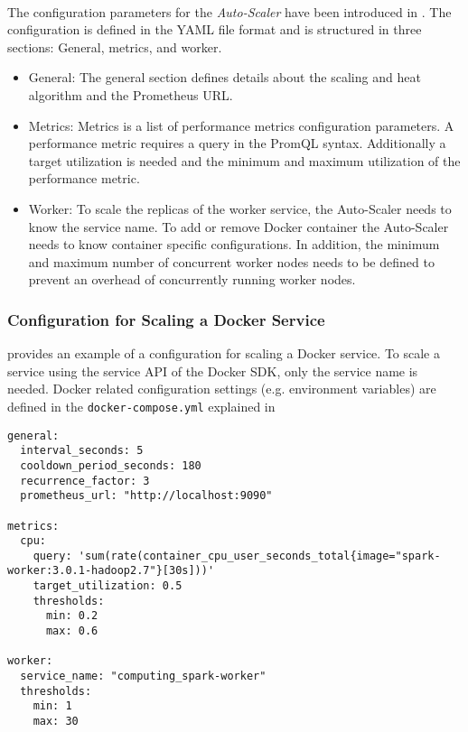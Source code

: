 \paragraph{}
The configuration parameters for the \textit{Auto-Scaler} have been introduced in .
The configuration is defined in the YAML file format and is structured in three sections: General, metrics, and worker.
\begin{itemize}
\item General:
The general section defines details about the scaling and heat algorithm and the Prometheus URL.

\item Metrics:
Metrics is a list of performance metrics configuration parameters. A performance metric requires a query in the PromQL syntax. Additionally a target utilization is needed and the minimum and maximum utilization of the performance metric.

\item Worker:
To scale the replicas of the worker service, the Auto-Scaler needs to know the service name. To add or remove Docker container the Auto-Scaler needs to know container specific configurations. In addition, the minimum and maximum number of concurrent worker nodes needs to be defined to prevent an overhead of concurrently running worker nodes.
\end{itemize}


\subsubsection{Configuration for Scaling a Docker Service}
 provides an example of a configuration for scaling a Docker service.
%
To scale a service using the service API of the Docker SDK, only the service name is needed.
%
Docker related configuration settings (e.g. environment variables) are defined in the \texttt{docker-compose.yml} explained in 
\begin{lstlisting}[label=lst:06_auto-scaler_config_service_example, caption=\textit{Auto-Scaler} configuration for scaling Docker Services]
general:
  interval_seconds: 5
  cooldown_period_seconds: 180
  recurrence_factor: 3
  prometheus_url: "http://localhost:9090"
 
metrics:
  cpu:
    query: 'sum(rate(container_cpu_user_seconds_total{image="spark-worker:3.0.1-hadoop2.7"}[30s]))'
    target_utilization: 0.5
    thresholds:
      min: 0.2
      max: 0.6
 
worker:
  service_name: "computing_spark-worker"
  thresholds:
    min: 1
    max: 30
\end{lstlisting}


